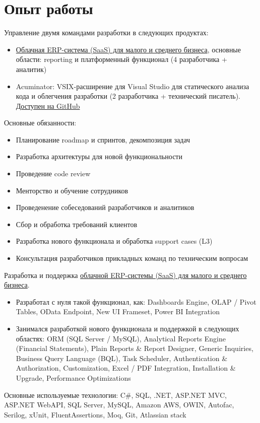 \section{Опыт работы}
{Управление двумя командами разработки в следующих продуктах:
\begin{itemize}[label=\textbullet]
  \item \href{https://www.acumatica.com/}{Облачная ERP-система (SaaS) для малого и среднего бизнеса}, основные области: reporting и платформенный функционал (4 разработчика + аналитик)
  \item Acuminator: VSIX-расширение для Visual Studio для статического анализа кода и облегчения разработки (2 разработчика + технический писатель). \href{https://github.com/Acumatica/Acuminator}{Доступен на GitHub \faGithub}
\end{itemize}
Основные обязанности:
\begin{itemize}[label=\textbullet]
  \item Планирование roadmap и спринтов, декомпозиция задач
  \item Разработка архитектуры для новой функциональности
  \item Проведение code review
  \item Менторство и обучение сотрудников
  \item Проведенение собеседований разработчиков и аналитиков
  \item Сбор и обработка требований клиентов
  \item Разработка нового функционала и обработка support cases (L3)
  \item Консультация разработчиков прикладных команд по техническим вопросам
\end{itemize}}
{Разработка и поддержка \href{https://www.acumatica.com/}{облачной ERP-системы (SaaS) для малого и среднего бизнеса}.
\begin{itemize}[label=\textbullet]
  \item Разработал с нуля такой функционал, как: Dashboards Engine, OLAP / Pivot Tables, OData Endpoint, New UI Frameset, Power BI Integration
  \item Занимался разработкой нового функционала и поддержкой в следующих областях: ORM (SQL Server / MySQL), Analytical Reports Engine (Financial Statements), Plain Reports \& Report Designer, Generic Inquiries, Business Query Language (BQL), Task Scheduler, Authentication \& Authorization, Customization, Excel / PDF Integration, Installation \& Upgrade, Performance Optimizations
\end{itemize}
Основные используемые технологии: C\#, SQL, .NET, ASP.NET MVC, ASP.NET WebAPI, SQL Server, MySQL, Amazon AWS, OWIN, Autofac, Serilog, xUnit, FluentAssertions, Moq, Git, Atlassian stack}
